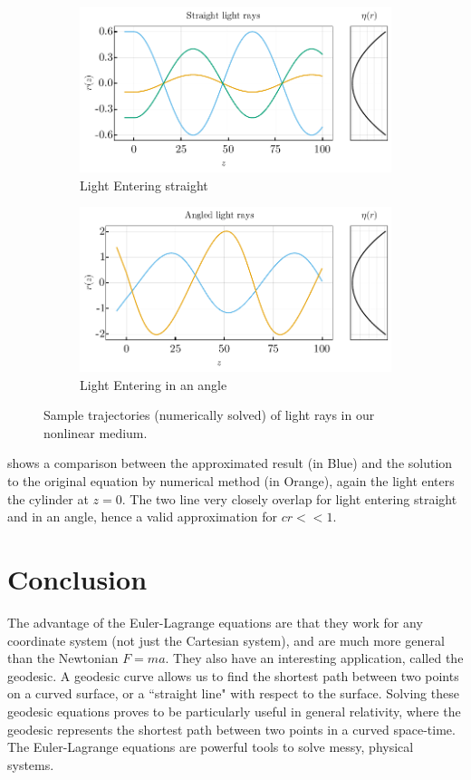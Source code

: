 \documentclass[%
 amsmath,amssymb,
aps,
 fleqn,
 notitlepage,
]{revtex4-2}
\begin{document}
\begin{figure}
    \begin{subfigure}{.5\textwidth}
      \includegraphics[width=.9\linewidth]{ray_sim.pdf}
      \caption{Light Entering straight}
    \end{subfigure}%
    \begin{subfigure}{.5\textwidth}
      \includegraphics[width=.9\linewidth]{ray_sim_angled.pdf}
      \caption{Light Entering in an angle}
    \end{subfigure}
    \caption{Sample trajectories (numerically solved) of light rays in our nonlinear medium.}
    \label{fig: comp}
\end{figure}


 shows a comparison between the approximated result (in Blue) and the solution to the original equation by numerical method (in Orange), again the light enters the cylinder at $z=0$. The two line very closely overlap for light entering straight and in an angle, hence a valid approximation for $cr << 1$.

\section{Conclusion}

The advantage of the Euler-Lagrange equations are that they work for any coordinate system (not just the Cartesian system), and are much more general than the Newtonian $F = ma$. They also have an interesting application, called the geodesic. A geodesic curve allows us to find the shortest path between two points on a curved surface, or a “straight line" with respect to the surface. Solving these geodesic equations proves to be particularly useful in general relativity, where the geodesic represents the shortest path between two points in a curved space-time. The Euler-Lagrange equations are powerful tools to solve messy, physical systems.
\end{document}
